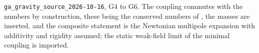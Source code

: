 \texttt{ga\_gravity\_source\_2026-10-16}, G4 to G6. The coupling commutes with the numbers by construction, these being the conserved numbers of , the masses are inserted, and the composite statement is the Newtonian multipole expansion with additivity and rigidity assumed; the static weak-field limit of the minimal coupling is imported.
